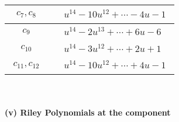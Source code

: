 \documentclass[1p]{elsarticle_modified}
\theoremstyle{definition}
\begin{document}
\begin{tabular}{m{50pt}|m{274pt}}
\hline $$\begin{aligned}c_{7},c_{8}\end{aligned}$$&$\begin{aligned}
&u^{14}-10 u^{12}+\cdots-4 u-1
\end{aligned}$\\
\hline $$\begin{aligned}c_{9}\end{aligned}$$&$\begin{aligned}
&u^{14}-2 u^{13}+\cdots+6 u-6
\end{aligned}$\\
\hline $$\begin{aligned}c_{10}\end{aligned}$$&$\begin{aligned}
&u^{14}-3 u^{12}+\cdots+2 u+1
\end{aligned}$\\
\hline $$\begin{aligned}c_{11},c_{12}\end{aligned}$$&$\begin{aligned}
&u^{14}-10 u^{12}+\cdots+4 u-1
\end{aligned}$\\
\hline
\end{tabular}\\~\\
\newpage\renewcommand{\arraystretch}{1}
\flushleft \textbf{(v) Riley Polynomials at the component}\newline \\
\end{document}
